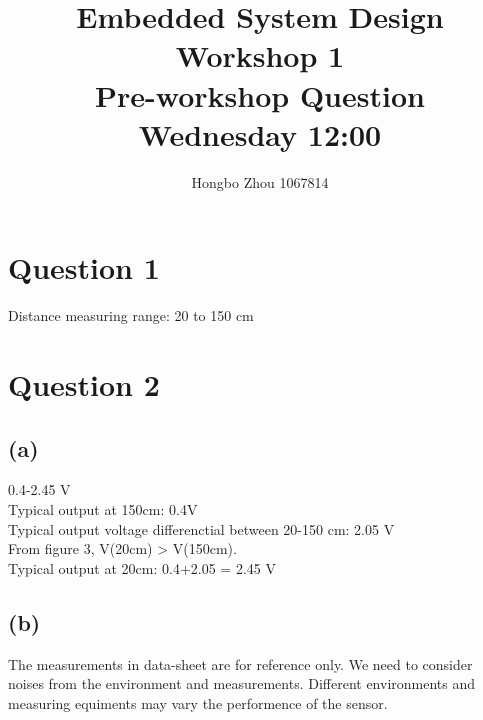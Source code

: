 \documentclass[12pt]{article}
\title{Embedded System Design Workshop 1\\
Pre-workshop Question \\
Wednesday 12:00}
\author{
    Hongbo Zhou 1067814
}
\date{}
\begin{document}
\maketitle

\section*{Question 1}
Distance measuring range: 20 to 150 cm

\section*{Question 2}
\subsection*{(a)}
0.4-2.45 V \\
Typical output at 150cm: 0.4V \\
Typical output voltage differenctial between 20-150 cm: 2.05 V \\
From figure 3, V(20cm) > V(150cm). \\
Typical output at 20cm: 0.4+2.05 = 2.45 V
\subsection*{(b)}
The measurements in data-sheet are for reference only. We need to consider noises from the environment and measurements.
Different environments and measuring equiments may vary the performence of the sensor.
\end{document}
